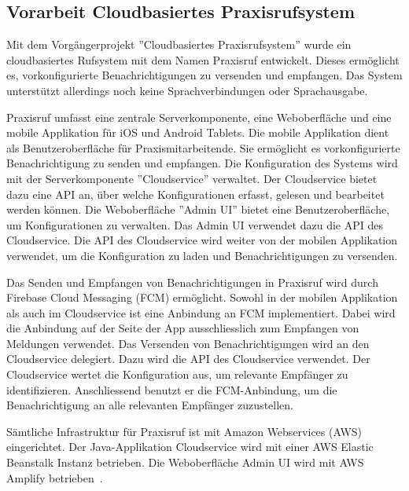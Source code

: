 \subsection{Vorarbeit Cloudbasiertes Praxisrufsystem}

Mit dem Vorgängerprojekt ''Cloudbasiertes Praxisrufsystem'' wurde ein cloudbasiertes Rufsystem mit dem Namen Praxisruf entwickelt.
Dieses ermöglicht es, vorkonfigurierte Benachrichtigungen zu versenden und empfangen.
Das System unterstützt allerdings noch keine Sprachverbindungen oder Sprachausgabe.

Praxisruf umfasst eine zentrale Serverkomponente, eine Weboberfläche und eine mobile Applikation für iOS und Android Tablets.
Die mobile Applikation dient als Benutzeroberfläche für Praxismitarbeitende.
Sie ermöglicht es vorkonfigurierte Benachrichtigung zu senden und empfangen.
Die Konfiguration des Systems wird mit der Serverkomponente ''Cloudservice'' verwaltet.
Der Cloudservice bietet dazu eine API an, über welche Konfigurationen erfasst, gelesen und bearbeitet werden können.
Die Weboberfläche ''Admin UI'' bietet eine Benutzeroberfläche, um Konfigurationen zu verwalten.
Das Admin UI verwendet dazu die API des Cloudservice.
Die API des Cloudservice wird weiter von der mobilen Applikation verwendet, um die Konfiguration zu laden und Benachrichtigungen zu versenden.

Das Senden und Empfangen von Benachrichtigungen in Praxisruf wird durch Firebase Cloud Messaging (FCM) ermöglicht.
Sowohl in der mobilen Applikation als auch im Cloudservice ist eine Anbindung an FCM implementiert.
Dabei wird die Anbindung auf der Seite der App ausschliesslich zum Empfangen von Meldungen verwendet.
Das Versenden von Benachrichtigungen wird an den Cloudservice delegiert.
Dazu wird die API des Cloudservice verwendet.
Der Cloudservice wertet die Konfiguration aus, um relevante Empfänger zu identifizieren.
Anschliessend benutzt er die FCM-Anbindung, um die Benachrichtigung an alle relevanten Empfänger zuzustellen.

Sämtliche Infrastruktur für Praxisruf ist mit Amazon Webservices (AWS) eingerichtet.
Der Java-Applikation Cloudservice wird mit einer AWS Elastic Beanstalk Instanz betrieben.
Die Weboberfläche Admin UI wird mit AWS Amplify betrieben~\cite{ip5}.
